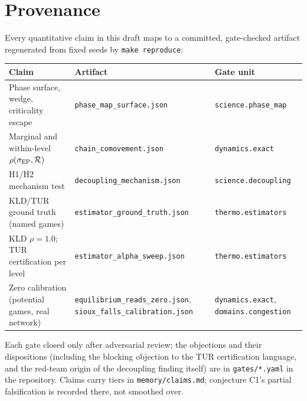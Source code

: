 \section*{Provenance}

Every quantitative claim in this draft maps to a committed, gate-checked
artifact regenerated from fixed seeds by \texttt{make reproduce}:

\begin{center}
\footnotesize
\setlength{\tabcolsep}{4pt}
\begin{tabular}{@{}>{\raggedright\arraybackslash}p{4.3cm}>{\raggedright\arraybackslash}p{6.3cm}>{\raggedright\arraybackslash}p{4.4cm}@{}}
\toprule
Claim & Artifact & Gate unit \\
\midrule
Phase surface, wedge, criticality escape & \texttt{phase\_map\_surface.json} & \texttt{science.phase\_map} \\
Marginal and within-level $\rho(\sigma_{\mathrm{EP}},\mathcal{R})$ & \texttt{chain\_comovement.json} & \texttt{dynamics.exact} \\
H1/H2 mechanism test & \texttt{decoupling\_mechanism.json} & \texttt{science.decoupling} \\
KLD/TUR ground truth (named games) & \texttt{estimator\_ground\_truth.json} & \texttt{thermo.estimators} \\
KLD $\rho = 1.0$; TUR certification per level & \texttt{estimator\_alpha\_sweep.json} & \texttt{thermo.estimators} \\
Zero calibration (potential games, real network) & \texttt{equilibrium\_reads\_zero.json}, \texttt{sioux\_falls\_calibration.json} & \texttt{dynamics.exact}, \texttt{domains.congestion} \\
\bottomrule
\end{tabular}
\end{center}

Each gate closed only after adversarial review; the objections and their
dispositions (including the blocking objection to the TUR certification
language, and the red-team origin of the decoupling finding itself) are in
\texttt{gates/*.yaml} in the repository. Claims carry tiers in
\texttt{memory/claims.md}; conjecture C1's partial falsification is recorded
there, not smoothed over.
